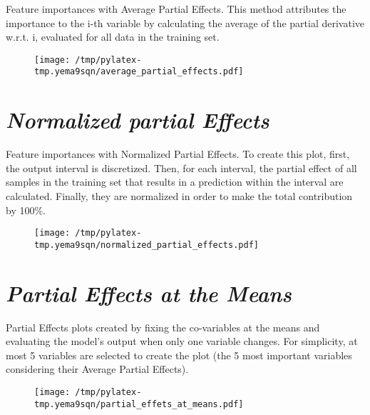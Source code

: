 \documentclass{article}%
\begin{document}
                Feature importances with Average Partial Effects. This method
                attributes the importance to the i-th variable by calculating
                the average of the partial derivative w.r.t. i, evaluated for
                all data in the training set.

                \vfill%


\begin{figure}[H]%
\centering%
\texttt{[image: /tmp/pylatex-tmp.yema9sqn/average\_partial\_effects.pdf]}%
\end{figure}

%
\vfill \pagebreak

%
\section*{\textit{Normalized partial Effects}}%
\label{sec:textitNormalizedpartialEffects}%

                Feature importances with Normalized Partial Effects. 
                To create this plot, first, the output interval is discretized.
                Then, for each interval, the partial effect of all samples
                in the training set that results in a prediction within the
                interval are calculated. Finally, they are normalized in
                order to make the total contribution by 100\%.

                \vfill%


\begin{figure}[H]%
\centering%
\texttt{[image: /tmp/pylatex-tmp.yema9sqn/normalized\_partial\_effects.pdf]}%
\end{figure}

%
\vfill \pagebreak

%
\section*{\textit{Partial Effects at the Means}}%
\label{sec:textitPartialEffectsattheMeans}%

                Partial Effects plots created by fixing the co-variables at
                the means and evaluating the model's output when only one
                variable changes. For simplicity, at most 5 variables are
                selected to create the plot (the 5 most important variables
                considering their Average Partial Effects).

                \vfill%


\begin{figure}[H]%
\centering%
\texttt{[image: /tmp/pylatex-tmp.yema9sqn/partial\_effets\_at\_means.pdf]}%
\end{figure}

%
\vfill \pagebreak

%
\end{document}
